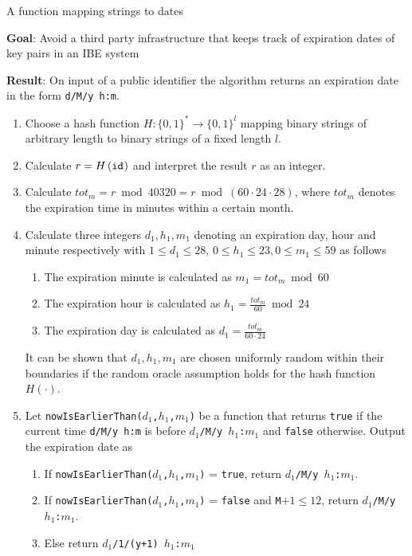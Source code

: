 \begin{algorithm}
\caption{A function mapping strings to dates}
\label{alg:map_to_date}
\begin{description}
 \item \textbf{Goal}: Avoid a third party infrastructure that keeps track of expiration dates of key pairs in an IBE system
 
 \item \textbf{Result}: On input of a public identifier \id{} the algorithm returns an expiration date in the form \texttt{d/M/y h:m}.
\end{description}
 \begin{enumerate}
  \item Choose a hash function $H: \{ 0, 1 \}^* \rightarrow \{ 0,1 \}^l$ mapping binary strings of arbitrary length to binary strings of a fixed length $l$.
  \item Calculate $r = H \left( \mathtt{id}_{} \right)$ and interpret the result $r$ as an integer.
  \item Calculate $tot_m = r \bmod 40320 = r \bmod \left( 60 \cdot 24 \cdot 28 \right)$, where $tot_m$ denotes the expiration time in minutes within a certain month.
  \item Calculate three integers $d_1, h_1, m_1$ denoting an expiration day, hour and minute respectively with $1 \leq d_1 \leq 28$, $0 \leq h_1 \leq 23, 0 \leq m_1 \leq 59$ as follows 
  \begin{enumerate}
   \item The expiration minute is calculated as $m_1 = tot_m \bmod 60$
   \item The expiration hour is calculated as $h_1 = \frac{tot_m}{60} \bmod 24$
   \item The expiration day is calculated as $d_1 = \frac{tot_m}{60 \cdot 24}$
  \end{enumerate}
  It can be shown that $d_1, h_1, m_1$ are chosen uniformly random within their boundaries if the random oracle assumption holds for the hash function $H \left( \cdot \right)$.
  \item Let \texttt{nowIsEarlierThan($d_1$,$h_1$,$m_1$)} be a function that returns \texttt{true} if the current time \texttt{d/M/y h:m} is before \texttt{$d_1$/M/y $h_1$:$m_1$} and \texttt{false} otherwise. Output the expiration date as
  \begin{enumerate}
   \item If \texttt{nowIsEarlierThan($d_1$,$h_1$,$m_1$)} = \texttt{true}, return \texttt{$d_1$/M/y $h_1$:$m_1$}.
   \item If \texttt{nowIsEarlierThan($d_1$,$h_1$,$m_1$)} = \texttt{false} and \texttt{M}$+1 \leq 12$, return \texttt{$d_1$/M/y $h_1$:$m_1$}.
   \item Else return \texttt{$d_1$/1/(y+1) $h_1$:$m_1$}
  \end{enumerate}
 \end{enumerate}
\end{algorithm}


